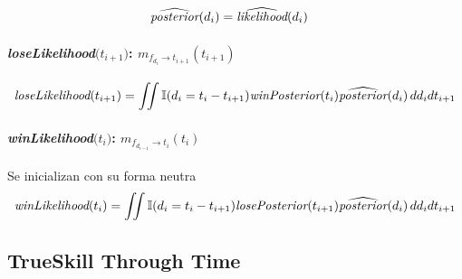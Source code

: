\documentclass[11pt,twoside,spanish]{report} %
\begin{document}
\begin{equation}
\begin{split}
\widehat{\emph{posterior}}(d_i) &= \widehat{\emph{likelihood}}(d_i)
\end{split}
\end{equation}

\paragraph{\emph{loseLikelihood}$\bm(t_{i+1})$: $m_{f_{d_i} \rightarrow t_{i+1}}(t_{i+1})$}

\begin{equation}
\begin{split}
\emph{loseLikelihood}(t_{i+1}) = \iint \mathbb{I}(d_{i} = t_i - t_{i+1} ) \emph{winPosterior}(t_i) \widehat{\emph{posterior}}(d_i) \, dd_idt_{i+1}
\end{split}
\end{equation}


\paragraph{\emph{winLikelihood}$\bm(t_{i})$: $m_{f_{d_{i-1}} \rightarrow t_{i}}(t_{i})$}
Se inicializan con su forma neutra
\begin{equation}
\begin{split}
\emph{winLikelihood}(t_{i}) = \iint \mathbb{I}(d_{i} = t_i - t_{i+1} ) \emph{losePosterior}(t_{i+1}) \widehat{\emph{posterior}}(d_i) \, dd_idt_{i+1}
\end{split}
\end{equation}

\subsection{TrueSkill Through Time}\label{appendix:ttt}
\end{document}
